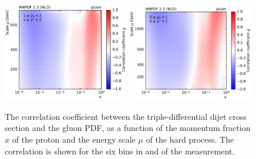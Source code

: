 \begin{figure}[htbp]
    \includegraphics[width=0.49\textwidth]{figures/pdf_constraints/corr_PTMAXEXPYS_YBYS_NLO_FINALBINS_NNPDF23_gluon_ys1_0yb1_0_cl.pdf}\hfill
    \includegraphics[width=0.49\textwidth]{figures/pdf_constraints/corr_PTMAXEXPYS_YBYS_NLO_FINALBINS_NNPDF23_gluon_ys0_0yb0_0_cl.pdf}\hfill
    \caption[Correlation between dijet cross section and gluon PDF]{
            The correlation coefficient between the triple-differential dijet cross
            section and the gluon PDF, as a function of the momentum fraction $x$ of the
            proton and the energy scale $\mu$ of the hard process. The correlation is shown
            for the six bins in \ystar and \yboost of the measurement.}
    \label{fig:pdfconstraints_gluon}
\end{figure}

